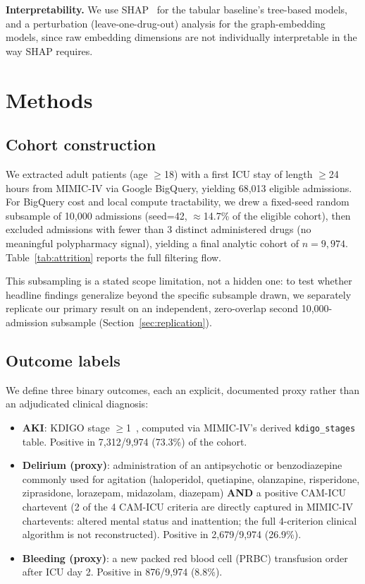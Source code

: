 \documentclass[conference]{IEEEtran}
\begin{document}
\textbf{Interpretability.} We use SHAP~\cite{lundberg2017shap} for the
tabular baseline's tree-based models, and a perturbation (leave-one-drug-out)
analysis for the graph-embedding models, since raw embedding dimensions are
not individually interpretable in the way SHAP requires.

\section{Methods}
\label{sec:methods}

\subsection{Cohort construction}

We extracted adult patients (age $\geq$18) with a first ICU stay of
length $\geq$24 hours from MIMIC-IV via Google BigQuery, yielding 68{,}013
eligible admissions. For BigQuery cost and local compute tractability, we
drew a fixed-seed random subsample of 10{,}000 admissions (seed=42,
$\approx$14.7\% of the eligible cohort), then excluded admissions with fewer
than 3 distinct administered drugs (no meaningful polypharmacy signal),
yielding a final analytic cohort of $n=9{,}974$. Table~\ref{tab:attrition}
reports the full filtering flow.



This subsampling is a stated scope limitation, not a hidden one: to test
whether headline findings generalize beyond the specific subsample drawn, we
separately replicate our primary result on an independent, zero-overlap
second 10{,}000-admission subsample (Section~\ref{sec:replication}).

\subsection{Outcome labels}

We define three binary outcomes, each an explicit, documented proxy rather
than an adjudicated clinical diagnosis:

\begin{itemize}
\item \textbf{AKI}: KDIGO stage $\geq$1~\cite{khwaja2012kdigo}, computed via
  MIMIC-IV's derived \texttt{kdigo\_stages} table. Positive in 7{,}312/9{,}974
  (73.3\%) of the cohort.
\item \textbf{Delirium (proxy)}: administration of an antipsychotic or
  benzodiazepine commonly used for agitation (haloperidol, quetiapine,
  olanzapine, risperidone, ziprasidone, lorazepam, midazolam, diazepam)
  \textbf{AND} a positive CAM-ICU~\cite{ely2001camicu} chartevent (2 of the
  4 CAM-ICU criteria are directly captured in MIMIC-IV chartevents: altered
  mental status and inattention; the full 4-criterion clinical algorithm is
  not reconstructed). Positive in 2{,}679/9{,}974 (26.9\%).
\item \textbf{Bleeding (proxy)}: a new packed red blood cell (PRBC)
  transfusion order after ICU day 2. Positive in 876/9{,}974 (8.8\%).
\end{itemize}
\end{document}
